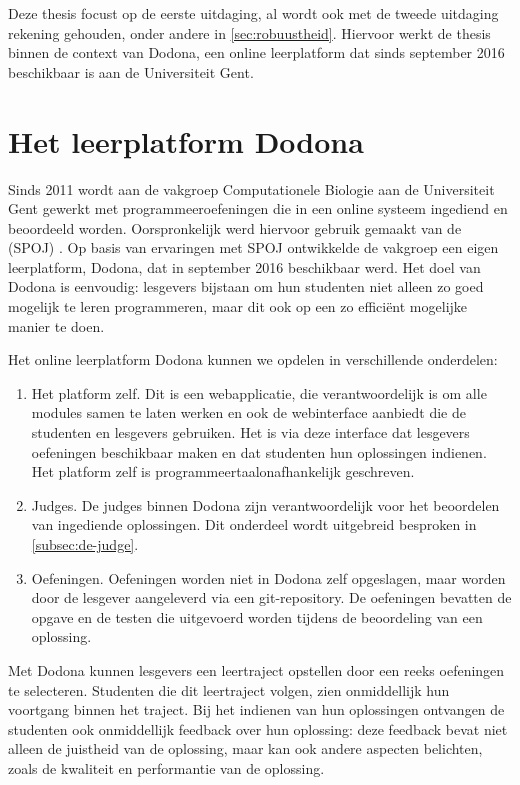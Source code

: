 Deze thesis focust op de eerste uitdaging, al wordt ook met de tweede uitdaging rekening gehouden, onder andere in \cref{sec:robuustheid}.
Hiervoor werkt de thesis binnen de context van Dodona, een online leerplatform dat sinds september 2016 beschikbaar is aan de Universiteit Gent.

\section{Het leerplatform Dodona}\label{sec:wat-is-dodona}

Sinds 2011 wordt aan de vakgroep Computationele Biologie aan de Universiteit Gent gewerkt met programmeeroefeningen die in een online systeem ingediend en beoordeeld worden.
Oorspronkelijk werd hiervoor gebruik gemaakt van de  (SPOJ) \autocite{10.1007/978-3-540-78139-4_31}.
Op basis van ervaringen met SPOJ ontwikkelde de vakgroep een eigen leerplatform, Dodona, dat in september 2016 beschikbaar werd.
Het doel van Dodona is eenvoudig: lesgevers bijstaan om hun studenten niet alleen zo goed mogelijk te leren programmeren, maar dit ook op een zo efficiënt mogelijke manier te doen.

Het online leerplatform Dodona kunnen we opdelen in verschillende onderdelen:
\begin{enumerate}
    \item Het platform zelf.
    Dit is een webapplicatie, die verantwoordelijk is om alle modules samen te laten werken en ook de webinterface aanbiedt die de studenten en lesgevers gebruiken.
    Het is via deze interface dat lesgevers oefeningen beschikbaar maken en dat studenten hun oplossingen indienen.
    Het platform zelf is programmeertaalonafhankelijk geschreven.
    \item Judges.
    De judges binnen Dodona zijn verantwoordelijk voor het beoordelen van ingediende oplossingen.
    Dit onderdeel wordt uitgebreid besproken in \cref{subsec:de-judge}.
    \item Oefeningen.
    Oefeningen worden niet in Dodona zelf opgeslagen, maar worden door de lesgever aangeleverd via een git-repository.
    De oefeningen bevatten de opgave en de testen die uitgevoerd worden tijdens de beoordeling van een oplossing.
\end{enumerate}

Met Dodona kunnen lesgevers een leertraject opstellen door een reeks oefeningen te selecteren.
Studenten die dit leertraject volgen, zien onmiddellijk hun voortgang binnen het traject.
Bij het indienen van hun oplossingen ontvangen de studenten ook onmiddellijk feedback over hun oplossing: deze feedback bevat niet alleen de juistheid van de oplossing, maar kan ook andere aspecten belichten, zoals de kwaliteit en performantie van de oplossing.

